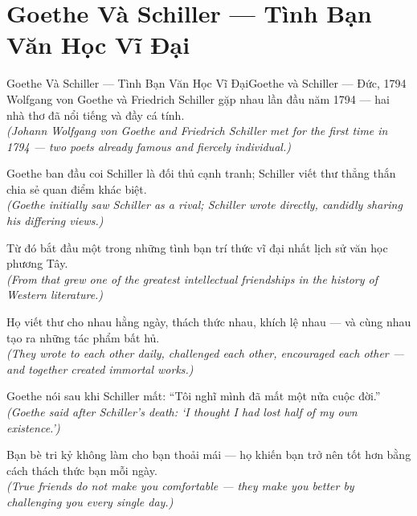 \section{Goethe Và Schiller --- Tình Bạn Văn Học Vĩ Đại}
\begin{truyen}{Goethe Và Schiller --- Tình Bạn Văn Học Vĩ Đại}{Goethe và Schiller --- Đức, 1794}
 Wolfgang von Goethe và Friedrich Schiller gặp nhau lần đầu năm 1794 --- hai nhà thơ đã nổi tiếng và đầy cá tính.\\[4pt]
\textit{(Johann Wolfgang von Goethe and Friedrich Schiller met for the first time in 1794 --- two poets already famous and fiercely individual.)}

Goethe ban đầu coi Schiller là đối thủ cạnh tranh; Schiller viết thư thẳng thắn chia sẻ quan điểm khác biệt.\\[4pt]
\textit{(Goethe initially saw Schiller as a rival; Schiller wrote directly, candidly sharing his differing views.)}

Từ đó bắt đầu một trong những tình bạn trí thức vĩ đại nhất lịch sử văn học phương Tây.\\[4pt]
\textit{(From that grew one of the greatest intellectual friendships in the history of Western literature.)}

Họ viết thư cho nhau hằng ngày, thách thức nhau, khích lệ nhau --- và cùng nhau tạo ra những tác phẩm bất hủ.\\[4pt]
\textit{(They wrote to each other daily, challenged each other, encouraged each other --- and together created immortal works.)}

Goethe nói sau khi Schiller mất: ``Tôi nghĩ mình đã mất một nửa cuộc đời.''\\[4pt]
\textit{(Goethe said after Schiller's death: `I thought I had lost half of my own existence.')}

\end{truyen}
\begin{baihoc}
  Bạn bè tri kỷ không làm cho bạn thoải mái --- họ khiến bạn trở nên tốt hơn bằng cách thách thức bạn mỗi ngày.\\[4pt]
  \textit{(True friends do not make you comfortable --- they make you better by challenging you every single day.)}
\end{baihoc}

